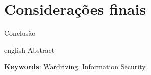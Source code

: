 \documentclass[
	article,			%
	12pt,				%
	oneside,			%
	a4paper,			%
	english,			%
	brazil,				%
	sumario=tradicional
	]{abntex2}
\begin{document}

\section*{Considerações finais}

Conclusão

\postextual


\emptythanks
\maketitle

\renewcommand{\resumoname}{Abstract}
\begin{resumoumacoluna}
 \begin{otherlanguage*}{english}
   Abstract

   \vspace{\onelineskip}

   \noindent
   \textbf{Keywords}: Wardriving. Information Security.
 \end{otherlanguage*}
\end{resumoumacoluna}


\end{document}
